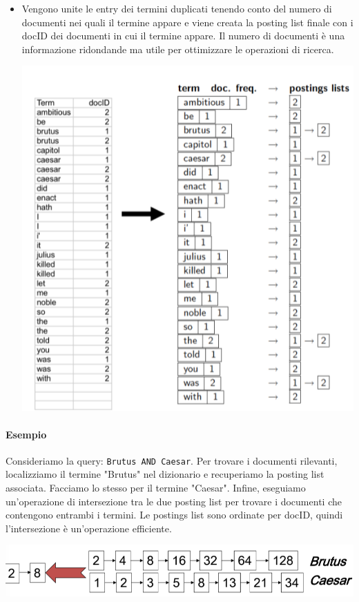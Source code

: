 \documentclass{report}
\begin{document}
\begin{enumerate}
\begin{itemize}
\begin{center}
			\end{center}
			\item Vengono unite le entry dei termini duplicati tenendo conto del numero di documenti nei quali il termine appare e viene creata la posting list finale con i docID dei documenti in cui il termine appare. Il numero di documenti è una informazione ridondande ma utile per ottimizzare le operazioni di ricerca.
			\begin{center}
				\includegraphics[scale=0.4]{assets/invindexfinal.png}
			\end{center}
		\end{itemize}
	\end{enumerate}

	\paragraph{Esempio}
	Consideriamo la query: \texttt{Brutus AND Caesar}. Per trovare i documenti rilevanti, localizziamo il termine "Brutus" nel dizionario e recuperiamo la posting list associata. Facciamo lo stesso per il termine "Caesar". Infine, eseguiamo un'operazione di intersezione tra le due posting list per trovare i documenti che contengono entrambi i termini. Le postings list sono ordinate per docID, quindi l'intersezione è un'operazione efficiente.
	\begin{center}
		\includegraphics[scale=0.4]{assets/invindexexample.png}
	\end{center}
\end{document}
